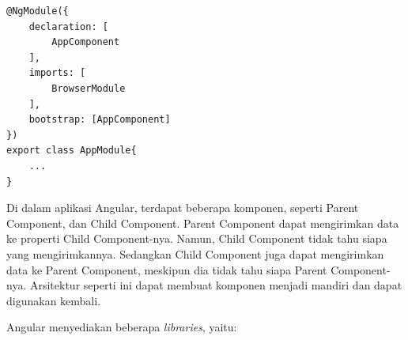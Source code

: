\begin{itemize}
\begin{lstlisting}[label={lst:moduleComponent}, caption=Module dengan Komponen]
@NgModule({
	declaration: [
		AppComponent
	],
	imports: [
		BrowserModule	
	],
	bootstrap: [AppComponent]
})
export class AppModule{
	...
}
\end{lstlisting} 
\end{itemize}

Di dalam aplikasi Angular, terdapat beberapa komponen, seperti Parent Component, dan Child Component. Parent Component dapat mengirimkan data ke properti Child Component-nya. Namun, Child Component tidak tahu siapa yang mengirimkannya. Sedangkan Child Component juga dapat mengirimkan data ke Parent Component, meskipun dia tidak tahu siapa Parent Component-nya. Arsitektur seperti ini dapat membuat komponen menjadi mandiri dan dapat digunakan kembali.

\newpage

Angular menyediakan beberapa \textit{libraries}, yaitu:

